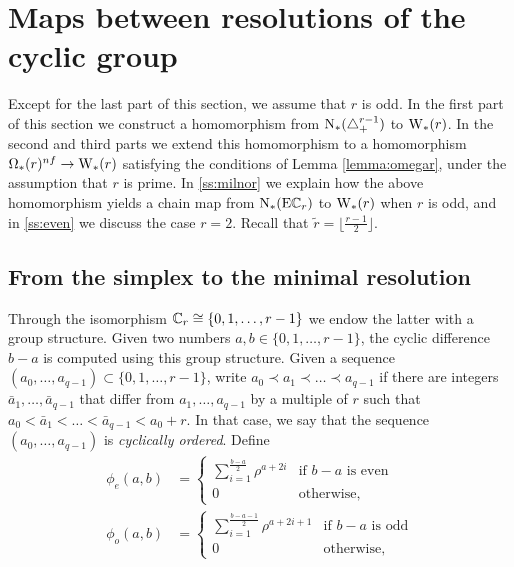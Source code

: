 
\section{Maps between resolutions of the cyclic group}\label{s:resolutions}

Except for the last part of this section, we assume that $r$ is odd. In the first part of this section we construct a homomorphism from $\operatorname{N}_{*}(\triangle_{+}^{r-1})$ to $\operatorname{W}_{*}(r)$. In the second and third parts we extend this homomorphism to a homomorphism $\Omega_*(r)^{nf} \to \operatorname{W}_{*}(r)$ satisfying the conditions of Lemma \ref{lemma:omegar}, under the assumption that $r$ is prime. In \cref{ss:milnor} we explain how the above homomorphism yields a chain map from $\operatorname{N}_{*}(\mathrm{E}\mathbb{C}_r)$ to $\operatorname{W}_{*}(r)$ when $r$ is odd, and in \cref{ss:even} we discuss the case $r=2$. Recall that $\tilde{r} = \lfloor \frac{r-1}{2}\rfloor$.

\subsection{From the simplex to the minimal resolution}

Through the isomorphism $\mathbb{C}_r \cong \{0,1,\dots,r-1\}$ we endow the latter with a group structure. Given two numbers $a,b\in \{0,1,\dots,r-1\}$, the cyclic difference $b-a$ is computed using this group structure. Given a sequence $(a_0,\dots,a_{q-1}) \subset \{0,1,\dots,r-1\}$, write $a_0\prec a_1\prec \dots\prec a_{q-1}$ if there are integers $\bar{a}_1,\dots,\bar{a}_{q-1}$ that differ from $a_1,\dots,a_{q-1}$ by a multiple of $r$ such that $a_0<\bar{a}_1<\dots<\bar{a}_{q-1}<a_0+r$. In that case, we say that the sequence $(a_0,\dots,a_{q-1})$ is \emph{cyclically ordered}. Define
\begin{align*}
	\phi_{e}(a,b) &= \begin{cases}
		\displaystyle \sum_{i=1}^{\frac{b-a}{2}} \rho^{a+2i} & \text{if $b-a$ is even} \\
		0 & \text{otherwise,}
	\end{cases}
	\\
	\phi_{o}(a,b) &= \begin{cases}
		\displaystyle \sum_{i=1}^{\frac{b-a-1}{2}} \rho^{a+2i+1} & \text{if $b-a$ is odd} \\
		0 & \text{otherwise,}
	\end{cases}
\end{align*}

